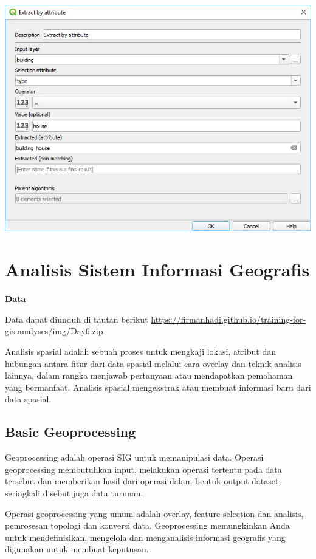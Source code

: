 \documentclass[]{book}
\begin{document}
\includegraphics{./img/gismodel7.png}

\hypertarget{hari_keenam}{%
\chapter{Analisis Sistem Informasi Geografis}\label{hari_keenam}}

\textbf{Data}

Data dapat diunduh di tautan berikut \url{https://firmanhadi.github.io/training-for-gis-analyses/img/Day6.zip}

Analisis spasial adalah sebuah proses untuk mengkaji lokasi, atribut dan hubungan antara fitur dari data spasial melalui cara overlay dan teknik analisis lainnya, dalam rangka menjawab pertanyaan atau mendapatkan pemahaman yang bermanfaat. Analisis spasial mengekstrak atau membuat informasi baru dari data spasial.

\hypertarget{basic-geoprocessing}{%
\section{Basic Geoprocessing}\label{basic-geoprocessing}}

Geoprocessing adalah operasi SIG untuk memanipulasi data. Operasi geoprocessing membutuhkan input, melakukan operasi tertentu pada data tersebut dan memberikan hasil dari operasi dalam bentuk output dataset, seringkali disebut juga data turunan.

Operasi geoprocessing yang umum adalah overlay, feature selection dan analisis, pemrosesan topologi dan konversi data. Geoprocessing memungkinkan Anda untuk mendefinisikan, mengelola dan menganalisis informasi geografis yang digunakan untuk membuat keputusan.
\end{document}
